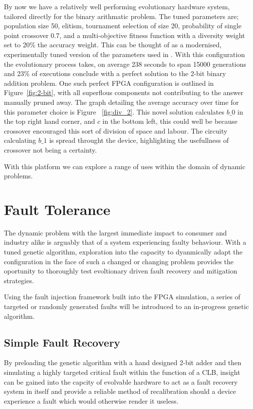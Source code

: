 By now we have a relatively well performing evolutionary hardware system,
tailored directly for the binary arithmatic problem. The tuned parameters
are; population size 50, elitism, tournament selection of size 20,
probability of single point crossover 0.7, and a multi-objective fitness function
with a diversity weight set to 20\% the accuracy weight.
This can be thought of as a modernised, experimentally tuned version of the
parameters used in \cite{10.1007/3-540-63173-9_61}.
With this configuration
the evolutionary process takes, on average 238 seconds to span 15000 generations
and 23\% of executions conclude with a perfect solution to the 2-bit binary addition
problem. One such perfect FPGA configuration is outlined in Figure~\ref{fig:2-bit},
with all superflous components not contributing to the answer manually pruned away.
The graph detailing the average accuracy over time for this parameter choice is Figure
~\ref{fig:div_2}.
This novel solution calculates $b\_0$ in the top right hand corner, and $c$ in the
bottom left, this could well be because crossover encouraged this sort of division
of space and labour. The circuity calculating $b\_1$ is spread throught the device,
highlighting the usefullness of crossover not being a certainty.

With this platform we can explore
a range of uses within the domain of dynamic problems.

\section{Fault Tolerance}

The dynamic problem with the largest immediate impact to consumer and industry
alike is arguably that of a system experiencing faulty behaviour.
With a tuned genetic algorithm, exploration into the capacity to dyanmically
adapt the configuration in the face of such a changed or changing problem provides
the oportunity to thoroughly test evoltionary driven fault recovery and mitigation
strategies.

Using the fault injection framework built into the FPGA simulation, a series
of targeted or randomly generated faults will be introduced to an in-progress
genetic algorithm.

\subsection{Simple Fault Recovery}

By preloading the genetic algorithm with a hand designed 2-bit adder
and then
simulating a highly targeted critical fault within the function of a CLB, insight
can be gained into the capcity of evolvable hardware to act as a fault recovery
system in itself and provide a reliable method of recalibration should a device
experience a fault which would otherwise render it useless.

